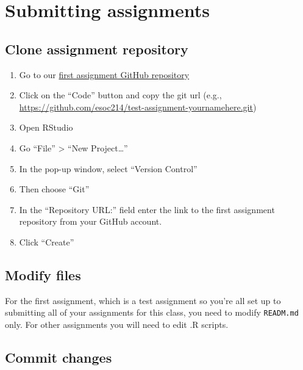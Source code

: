 \documentclass[
]{book}
\begin{document}
\hypertarget{submitting-assignments}{%
\section{Submitting assignments}\label{submitting-assignments}}

\hypertarget{clone-assignment-repository}{%
\subsection{Clone assignment repository}\label{clone-assignment-repository}}

\begin{enumerate}
\def\labelenumi{\arabic{enumi}.}
\item
  Go to our \href{https://classroom.github.com/a/uE1b8ho7}{first assignment GitHub repository}
\item
  Click on the ``Code'' button and copy the git url (e.g., \url{https://github.com/esoc214/test-assignment-yournamehere.git})
\item
  Open RStudio
\item
  Go ``File'' \textgreater{} ``New Project\ldots{}''
\item
  In the pop-up window, select ``Version Control''
\item
  Then choose ``Git''
\item
  In the ``Repository URL:'' field enter the link to the first assignment repository from your GitHub account.
\item
  Click ``Create''
\end{enumerate}

\hypertarget{modify-files}{%
\subsection{Modify files}\label{modify-files}}

For the first assignment, which is a test assignment so you're all set up to submitting all of your assignments for this class, you need to modify \texttt{READM.md} only. For other assignments you will need to edit .R scripts.

\hypertarget{commit-changes}{%
\subsection{Commit changes}\label{commit-changes}}
\end{document}
